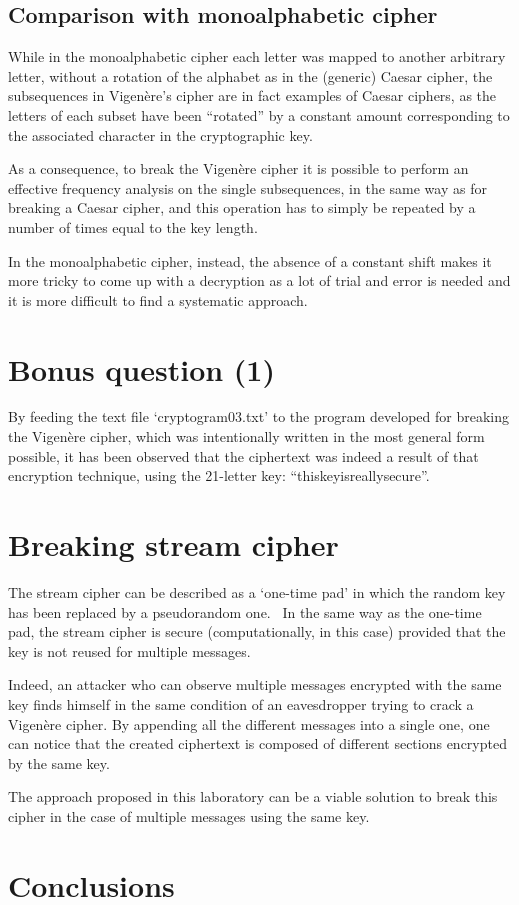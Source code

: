 \documentclass[12pt]{article}
\begin{document}
\subsection{Comparison with monoalphabetic cipher}

While in the monoalphabetic cipher each letter was mapped to another arbitrary letter, without a rotation of the alphabet as in the (generic) Caesar cipher, the subsequences in Vigenère's cipher are in fact examples of Caesar ciphers, as the letters of each subset have been ``rotated'' by a constant amount corresponding to the associated character in the cryptographic key.

As a consequence, to break the Vigenère cipher it is possible to perform an effective frequency analysis on the single subsequences, in the same way as for breaking a Caesar cipher, and this operation has to simply be repeated by a number of times equal to the key length.

In the monoalphabetic cipher, instead, the absence of a constant shift makes it more tricky to come up with a decryption as a lot of trial and error is needed and it is more difficult to find a systematic approach.

\section{Bonus question (1)}

By feeding the text file `cryptogram03.txt' to the program developed for breaking the Vigenère cipher, which was intentionally written in the most general form possible, it has been observed that the ciphertext was indeed a result of that encryption technique, using the 21-letter key: ``thiskeyisreallysecure''.

\section{Breaking stream cipher}

The stream cipher can be described as a `one-time pad' in which the random key has been replaced by a pseudorandom one. \
In the same way as the one-time pad, the stream cipher is secure (computationally, in this case) provided that the key is not reused for multiple messages.

Indeed, an attacker who can observe multiple messages encrypted with the same key finds himself in the same condition of an eavesdropper trying to crack a Vigenère cipher. By appending all the different messages into a single one, one can notice that the created ciphertext is composed of different sections encrypted by the same key.

The approach proposed in this laboratory can be a viable solution to break this cipher in the case of multiple messages using the same key.

\section{Conclusions}


\pagebreak
\end{document}

